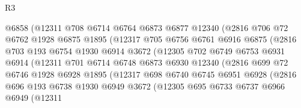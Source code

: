 \begin{lexlean}{R3}
\begin{coremodule}
                      @6858
                      (@12311
                        @708
                        @6714
                        @6764
                        @6873
                        @6877
                        @12340
                        (@2816
                          @706
                          @72
                          @6762
                          @1928
                          @6875
                          @1895
                          (@12317
                            @705
                            @6756
                            @6761
                            @6916
                            @6875
                            (@2816
                              @703
                              @193
                              @6754
                              @1930
                              @6914
                              @3672
                              (@12305
                                @702
                                @6749
                                @6753
                                @6931
                                @6914
                                (@12311
                                  @701
                                  @6714
                                  @6748
                                  @6873
                                  @6930
                                  @12340
                                  (@2816
                                    @699
                                    @72
                                    @6746
                                    @1928
                                    @6928
                                    @1895
                                    (@12317
                                      @698
                                      @6740
                                      @6745
                                      @6951
                                      @6928
                                      (@2816
                                        @696
                                        @193
                                        @6738
                                        @1930
                                        @6949
                                        @3672
                                        (@12305
                                          @695
                                          @6733
                                          @6737
                                          @6966
                                          @6949
                                          (@12311

\end{coremodule}
\end{lexlean}
